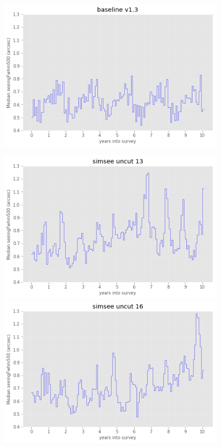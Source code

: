 \documentclass[DM,authoryear,toc]{lsstdoc}
\begin{document}
\begin{figure}
\begin{center}
  \includegraphics[width=\columnwidth]{./figures/seeing_baseline_v1_3_10yrs.png}
\endminipage\hfill
\end{center}
  \includegraphics[width=\columnwidth]{./figures/seeing_ss58777y13_v1_3_10yrs.png}
\endminipage\hfill
{}
  \includegraphics[width=\columnwidth]{./figures/seeing_ss58777y16_v1_3_10yrs.png}

\end{figure}
\end{document}
